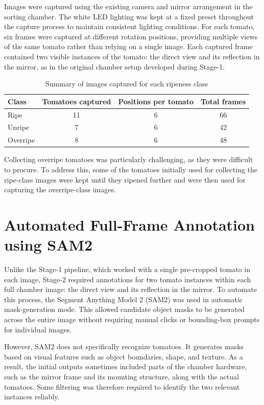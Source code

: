 \documentclass[12pt,a4paper]{report}
\begin{document}
Images were captured using the existing camera and mirror arrangement in the sorting chamber. The white LED lighting was kept at a fixed preset throughout the capture process to maintain consistent lighting conditions. For each tomato, six frames were captured at different rotation positions, providing multiple views of the same tomato rather than relying on a single image. Each captured frame contained two visible instances of the tomato: the direct view and its reflection in the mirror, as in the original chamber setup developed during Stage-1.

\begin{table}[H]
\setlength{\intextsep}{8pt}
\centering
\begin{tabular}{|l|c|c|c|}
\hline
\textbf{Class} & \textbf{Tomatoes captured} & \textbf{Positions per tomato} & \textbf{Total frames} \\
\hline
Ripe & 11 & 6 & 66 \\
Unripe & 7 & 6 & 42 \\
Overripe & 8 & 6 & 48 \\
\hline
\end{tabular}
\caption{Summary of images captured for each ripeness class}
\label{tab:capture-summary}
\end{table}
\vspace{-1em}

Collecting overripe tomatoes was particularly challenging, as they were difficult to procure. To address this, some of the tomatoes initially used for collecting the ripe-class images were kept until they ripened further and were then used for capturing the overripe-class images.
\section{Automated Full-Frame Annotation using SAM2}

Unlike the Stage-1 pipeline, which worked with a single pre-cropped tomato in each image, Stage-2 required annotations for two tomato instances within each full chamber image: the direct view and its reflection in the mirror. To automate this process, the Segment Anything Model 2 (SAM2) was used in automatic mask-generation mode. This allowed candidate object masks to be generated across the entire image without requiring manual clicks or bounding-box prompts for individual images.

However, SAM2 does not specifically recognize tomatoes. It generates masks based on visual features such as object boundaries, shape, and texture. As a result, the initial outputs sometimes included parts of the chamber hardware, such as the mirror frame and its mounting structure, along with the actual tomatoes. Some filtering was therefore required to identify the two relevant instances reliably.
\end{document}
